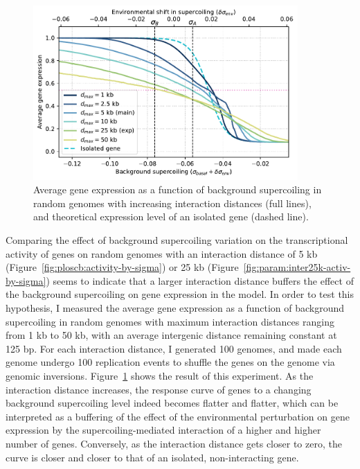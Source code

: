 \begin{figure}[H]
\centering
\includegraphics[width=0.9\textwidth]{param/interaction-25k/random_activ_per_sigma.pdf}
\caption[Average gene expression as a function of background supercoiling, with increasing interaction distances, in random genomes]{Average gene expression as a function of background supercoiling in random genomes with increasing interaction distances (full lines), and theoretical expression level of an isolated gene (dashed line).}
\label{fig:param:inter25k-random-activ-by-sigma}
\end{figure}

Comparing the effect of background supercoiling variation on the transcriptional activity of genes on random genomes with an interaction distance of 5 kb (Figure~\ref{fig:ploscb:activity-by-sigma}) or 25 kb (Figure~\ref{fig:param:inter25k-activ-by-sigma}) seems to indicate that a larger interaction distance buffers the effect of the background supercoiling on gene expression in the model.
In order to test this hypothesis, I measured the average gene expression as a function of background supercoiling in random genomes with maximum interaction distances ranging from 1 kb to 50 kb, with an average intergenic distance remaining constant at 125 bp.
For each interaction distance, I generated 100 genomes, and made each genome undergo 100 replication events to shuffle the genes on the genome via genomic inversions.
Figure~\ref{fig:param:inter25k-random-activ-by-sigma} shows the result of this experiment.
As the interaction distance increases, the response curve of genes to a changing background supercoiling level indeed becomes flatter and flatter, which can be interpreted as a buffering of the effect of the environmental perturbation on gene expression by the supercoiling-mediated interaction of a higher and higher number of genes.
Conversely, as the interaction distance gets closer to zero, the curve is closer and closer to that of an isolated, non-interacting gene.


